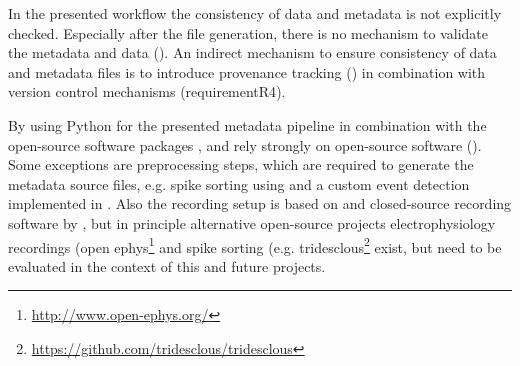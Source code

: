 In the presented workflow the consistency of data and metadata is not explicitly checked. Especially after the  file generation, there is no mechanism to validate the metadata and data (). An indirect mechanism to ensure consistency of data and metadata files is to introduce provenance tracking () in combination with version control mechanisms (requirement{R4}).

By using Python for the presented metadata pipeline in combination with the open-source software packages ,  and  \citet{Brochier_2018} rely strongly on open-source software (). Some exceptions are preprocessing steps, which are required to generate the metadata source files, e.g. spike sorting using  and a custom event detection implemented in . Also the recording setup is based on  and closed-source recording software by , but in principle alternative open-source projects electrophysiology recordings (open ephys\footnote{\url{http://www.open-ephys.org/}} and spike sorting (e.g. tridesclous\footnote{\url{https://github.com/tridesclous/tridesclous}} exist, but need to be evaluated in the context of this and future projects.


